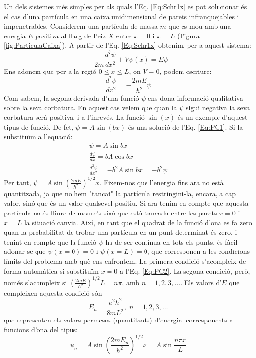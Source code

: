 \begin{mdframed}[backgroundcolor=gray!30,frametitle=Partícula en una caixa]
Un dels sistemes més simples per als quals l'Eq. \ref{Eq:Schr1x} es pot solucionar és el cas d'una partícula en una caixa unidimensional de parets infranquejables i impenetrables.
Considerem una partícula de massa $m$ que es mou amb una energia $E$ positiva al llarg de l'eix $X$ entre $x=0$ i $x=L$ (Figura \ref{fig:ParticulaCaixa}).
A partir de l'Eq. \ref{Eq:Schr1x} obtenim, per a aquest sistema:
\[
-\frac{}{2m}\frac{d^2 \psi}{dx^2}+V\psi(x)=E\psi
\]
Ens adonem que per a la regió $0\leq x \leq L$, on $V=0$, podem escriure:
 \[
\frac{d^2 \psi}{dx^2}=-\frac{2mE}{\hbar^2}\psi
\label{Eq:PC1}
\]
Com sabem, la segona derivada d'una funció $\psi$ ens dona informació qualitativa sobre la seva corbatura. En aquest cas veiem que quan la $\psi$ sigui negativa la seva corbatura serà positiva, i a l'inrevés. La funció $\sin(x)$ és un exemple d'aquest tipus de funció. De fet, $\psi=A \sin(bx)$ és una solució de l'Eq. \ref{Eq:PC1}. Si la substituïm a l'equació:
\begin{eqnarray*}
\psi = A \sin{bx} \\
\frac{d \psi}{d x} = bA \cos{bx} \\
\frac{d^2 \psi}{dx^2}=-b^2A \sin{bx}=-b^2 \psi
\label{Eq:PC2}
\end{eqnarray*}
Per tant, $\psi=A \sin{\left( \frac{2mE}{\hbar^2}\right)^{1/2} x}$. Fixem-nos que l'energia fins ara no està quantitzada, ja que no hem "tancat" la partícula restringint-la, encara, a cap valor, sinó que és un valor qualsevol positiu. Si ara tenim en compte que aquesta partícula no és lliure de moure's sinó que està tancada entre les parets $x=0$ i $x=L$ la situació canvia. Així, en tant que el quadrat de la funció d'ona es fa zero quan la probabilitat de trobar una partícula en un punt determinat és zero, i tenint en compte que la funció $\psi$ ha de ser contínua en tots els punts, és fàcil adonar-se que $\psi(x=0)=0$ i $\psi(x=L)=0$, que corresponen a les condicions límits del problema amb què ens enfrontem. La primera condició s'acompleix de forma automàtica si substituïm $x=0$ a l'Eq. \ref{Eq:PC2}. La segona condició, però, només s'acompleix si $\left( \frac{2mE}{\hbar^2}\right)^{1/2} L=n \pi$, amb $n=1,2,3,\ldots$. Els valors d'$E$ que compleixen aquesta condició són 
\[
E_n=\frac{n^2h^2}{8mL^2}, \; n=1,2,3,\ldots
\]
que representen els valors permesos (quantitzats) d'energia, corresponents a funcions d'ona del tipus:
\[
\psi_n=A \sin{\left( \frac{2mE_n}{\hbar^2}\right)^{1/2} x}=A \sin{\frac{n\pi x}{L}}
\]
\end{mdframed}
